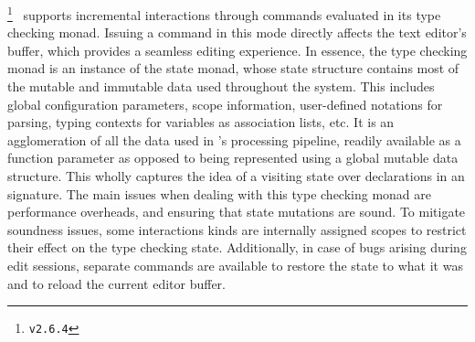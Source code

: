 \Agda\footnote{\Agda \texttt{v2.6.4}}~\cite{clffolp, norell2007towards, agda2023} supports incremental interactions through commands evaluated in its type checking monad.
Issuing a command in this \Agda mode directly affects the text editor's buffer, which provides a seamless editing experience.
In essence, the type checking monad is an instance of the state monad, whose state structure contains most of the mutable and immutable data used throughout the system.
This includes global configuration parameters, scope information, user-defined notations for parsing, typing contexts for variables as association lists, etc.
It is an agglomeration of all the data used in \Agda's processing pipeline, readily available as a function parameter as opposed to being represented using a global mutable data structure.
This wholly captures the idea of a visiting state over declarations in an \Agda signature.
The main issues when dealing with this type checking monad are performance overheads, and ensuring that state mutations are sound.
To mitigate soundness issues, some interactions kinds are internally assigned scopes to restrict their effect on the type checking state.
Additionally, in case of bugs arising during edit sessions, separate commands are available to restore the state to what it was and to reload the current editor buffer.



